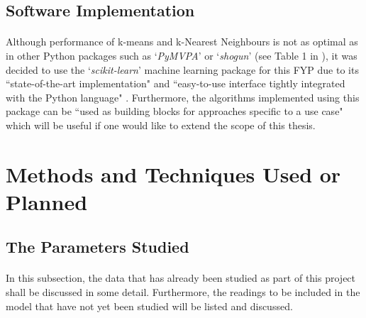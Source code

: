 \documentclass[12pt, twoside]{report}
\begin{document}
		
	\subsection{Software Implementation}
	\paragraph{ }Although performance of k-means and k-Nearest Neighbours is not as optimal as in other Python packages such as `\textit{PyMVPA}' \cite{r:pymvpa} or `\textit{shogun}' \cite{r:shogun} (see Table 1 in \cite{r:sklearn}), it was decided to use the `\textit{scikit-learn}' machine learning package for this FYP due to its ``state-of-the-art implementation" and ``easy-to-use interface tightly integrated with the Python language" \cite{r:sklearn}. Furthermore, the algorithms implemented using this package can be ``used as building blocks for approaches specific to a use case" \cite{r:sklearn} which will be useful if one would like to extend the scope of this thesis.
	
	
	
	\section{Methods and Techniques Used or Planned}
	\subsection{The Parameters Studied}
	\paragraph{ }In this subsection, the data that has already been studied as part of this project shall be discussed in some detail. Furthermore, the readings to be included in the model that have not yet been studied will be listed and discussed.
	
\end{document}
